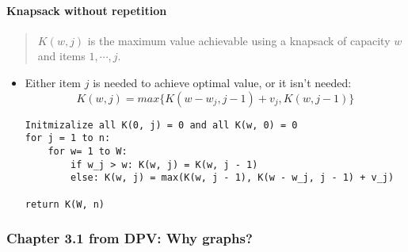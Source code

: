 \documentclass[a4paper,11pt]{article}
\begin{document}
\paragraph{Knapsack without
repetition}\label{knapsack-without-repetition}

\begin{quote}
$K(w, j)$ is the maximum value achievable using a knapsack of capacity
$w$ and items $1, \cdots, j$.
\end{quote}

\begin{itemize}
\item
  Either item $j$ is needed to achieve optimal value, or it isn't
  needed:
  \[K(w, j) = max \lbrace K(w - w_j, j - 1) + v_j, K(w, j - 1) \rbrace\]

\begin{verbatim}
Initmizalize all K(0, j) = 0 and all K(w, 0) = 0
for j = 1 to n:
    for w= 1 to W:
        if w_j > w: K(w, j) = K(w, j - 1)
        else: K(w, j) = max(K(w, j - 1), K(w - w_j, j - 1) + v_j)

return K(W, n)
\end{verbatim}
\end{itemize}

\subsubsection{Chapter 3.1 from DPV: Why
graphs?}\label{chapter-3.1-from-dpv-why-graphs}
\end{document}
